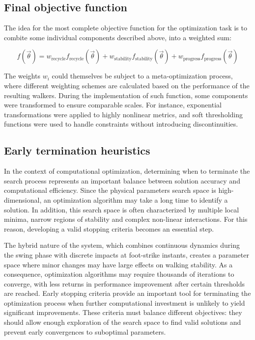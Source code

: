 \subsection{Final objective function}
The idea for the most complete objective function for the optimization task is to combite some individual components described above, into a weighted sum:

\begin{equation}\label{eq:opt_final_objective}
    f(\vec{\theta}) = w_{\text{recycle}} f_{\text{recycle}}(\vec{\theta}) + w_{\text{stability}} f_{\text{stability}}(\vec{\theta}) + w_{\text{progress}} f_{\text{progress}}(\vec{\theta})
\end{equation}

The weights $w_i$ could themselves be subject to a meta-optimization process, where different weighting schemes are calculated based on the performance of the resulting walkers.
During the implementation of such function, some components were transformed to ensure comparable scales.
For instance, exponential transformations were applied to highly nonlinear metrics, and soft thresholding functions were used to handle constraints without introducing discontinuities.

\subsection{Early termination heuristics}
In the context of computational optimization, determining when to terminate the search process represents an important balance between solution accuracy and computational efficiency.
Since the physical parameters search space is high-dimensional, an optimization algorithm may take a long time to identify a solution. 
In addition, this search space is often characterized by multiple local minima, narrow regions of stability and complex non-linear interactions.
For this reason, developing a valid stopping criteria becomes an essential step.

The hybrid nature of the system, which combines continuous dynamics during the swing phase with discrete impacts at foot-strike instants, creates a parameter space where minor changes may have large effects on walking stability.
As a consequence, optimization algorithms may require thousands of iterations to converge, with less returns in performance improvement after certain thresholds are reached.
Early stopping criteria provide an important tool for terminating the optimization process when further computational investment is unlikely to yield significant improvements.
These criteria must balance different objectives: they should allow enough exploration of the search space to find valid solutions and prevent early convergences to suboptimal parameters.

